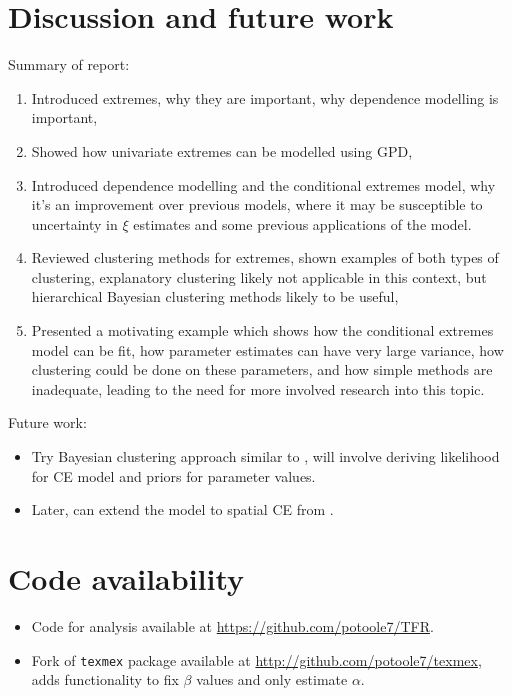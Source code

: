\documentclass{article}
\numberwithin{equation}{section}
\begin{document}
\section{Discussion and future work}\label{sec:discussion}

Summary of report:
\begin{itemize}
  \begin{enumerate}
    \item Introduced extremes, why they are important, why dependence modelling is important,
    \item Showed how univariate extremes can be modelled using GPD,
    \item Introduced dependence modelling and the conditional extremes model, why it's an improvement over previous models, where it may be susceptible to uncertainty in $\xi$ estimates and some previous applications of the model.
    \item Reviewed clustering methods for extremes, shown examples of both types of clustering, explanatory clustering likely not applicable in this context, but hierarchical Bayesian clustering methods likely to be useful,
    \item Presented a motivating example which shows how the conditional extremes model can be fit, how parameter estimates can have very large variance, how clustering could be done on these parameters, and how simple methods are inadequate, leading to the need for more involved research into this topic. 
  \end{enumerate}
\end{itemize}

Future work:
\begin{itemize}
  \item Try Bayesian clustering approach similar to \cite{Rohrbeck2021}, will involve deriving likelihood for CE model and priors for parameter values. 
  \item Later, can extend the model to spatial CE from \cite{Tawn2018}.
\end{itemize}

\section{Code availability}

\begin{itemize}
  \item Code for analysis available at \url{https://github.com/potoole7/TFR}.
  \item Fork of \texttt{texmex} package available at \url{http://github.com/potoole7/texmex}, adds functionality to fix $\beta$ values and only estimate $\alpha$. 
\end{itemize}

\newpage

\end{document}
